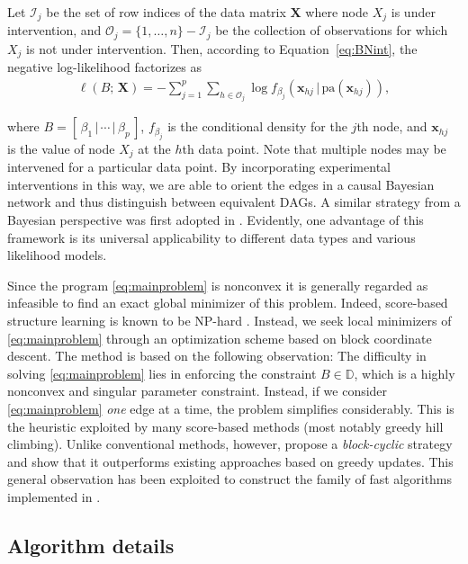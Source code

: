 \documentclass[article]{jss}
\newcommand{\nll}{\ell}
\newcommand{\dagmat}{B}
\newcommand{\dagspace}{\mathbb{D}}
\newcommand{\samplemat}{\mathbf{X}}
\newcommand{\samplematcol}{\mathbf{x}}
\renewcommand{\|}{\,|\,}
\begin{document}
\noindent
Let $\mathcal{I}_j$ be the set of row indices of the data matrix $\mathbf{X}$ where node $X_j$ is under intervention, and $\mathcal{O}_j = \{1, \ldots, n\} - \mathcal{I}_j$ be the collection of observations for which $X_j$ is not under intervention. Then, according to Equation~\ref{eq:BNint}, the negative log-likelihood factorizes as 
\begin{align}\label{eq:intervL}
\nll(\dagmat;\,\samplemat) = -\sum_{j=1}^p\sum_{h\in \mathcal{O}_j}\log f_{\beta_{j}}(\samplematcol_{hj}\|\text{pa}(\samplematcol_{hj})),
\end{align}

\noindent
where $\dagmat = [\,\beta_{1}\|\cdots\|\beta_{p}\,]$, $f_{\beta_{j}}$ is the conditional density for the $j$th node, and $\samplematcol_{hj}$ is the value of node $X_j$ at the $h$th data point. Note that multiple nodes may be intervened for a particular data point. By incorporating experimental interventions in this way, we are able to orient the edges in a causal Bayesian network and thus distinguish between equivalent DAGs. A similar strategy from a Bayesian perspective was first adopted in \citet{cooper1999causal}. Evidently, one advantage of this framework is its universal applicability to different data types and various likelihood models. 

Since the program \eqref{eq:mainproblem} is nonconvex it is generally regarded as infeasible to find an exact global minimizer of this problem. Indeed, score-based structure learning is known to be NP-hard \citep{chickering2004}. Instead, we seek local minimizers of \eqref{eq:mainproblem} through an optimization scheme based on block coordinate descent. The method is based on the following observation: The difficulty in solving \eqref{eq:mainproblem} lies in enforcing the constraint $\dagmat\in\dagspace$, which is a highly nonconvex and singular parameter constraint. Instead, if we consider \eqref{eq:mainproblem} \emph{one} edge at a time, the problem simplifies considerably. This is the heuristic exploited by many score-based methods (most notably greedy hill climbing). Unlike conventional methods, however, \citet{fu2013} propose a \emph{block-cyclic} strategy and show that it outperforms existing approaches based on greedy updates. This general observation has been exploited to construct the family of fast algorithms implemented in .

\subsection{Algorithm details}
\label{subsec:algorithm}
\end{document}
